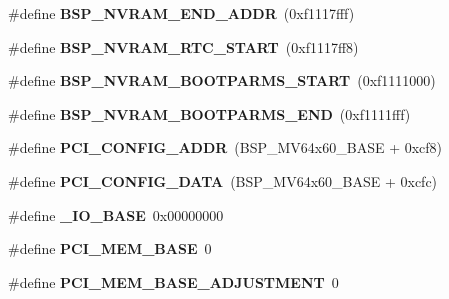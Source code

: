 \begin{DoxyCompactItemize}
\#define {\bfseries B\+S\+P\+\_\+\+N\+V\+R\+A\+M\+\_\+\+E\+N\+D\+\_\+\+A\+D\+DR}~(0xf1117fff)
\item 
\mbox{\label{group__RTEMSBSPsPowerPCBeatnik_ga3a6244f6de5b7d3f8e1a330345f9cb1e}} 
\#define {\bfseries B\+S\+P\+\_\+\+N\+V\+R\+A\+M\+\_\+\+R\+T\+C\+\_\+\+S\+T\+A\+RT}~(0xf1117ff8)
\item 
\mbox{\label{group__RTEMSBSPsPowerPCBeatnik_ga284c3151a3ceaad98c57222132a9d518}} 
\#define {\bfseries B\+S\+P\+\_\+\+N\+V\+R\+A\+M\+\_\+\+B\+O\+O\+T\+P\+A\+R\+M\+S\+\_\+\+S\+T\+A\+RT}~(0xf1111000)
\item 
\mbox{\label{group__RTEMSBSPsPowerPCBeatnik_ga9d6dc9c63b0555fde662d13073737982}} 
\#define {\bfseries B\+S\+P\+\_\+\+N\+V\+R\+A\+M\+\_\+\+B\+O\+O\+T\+P\+A\+R\+M\+S\+\_\+\+E\+ND}~(0xf1111fff)
\item 
\mbox{\label{group__RTEMSBSPsPowerPCBeatnik_ga021c1fbdf175999fc707979d4674f5b9}} 
\#define {\bfseries P\+C\+I\+\_\+\+C\+O\+N\+F\+I\+G\+\_\+\+A\+D\+DR}~(B\+S\+P\+\_\+\+M\+V64x60\+\_\+\+B\+A\+SE + 0xcf8)
\item 
\mbox{\label{group__RTEMSBSPsPowerPCBeatnik_gad1fedcf5fe37518ccc1ddfcb880d1b01}} 
\#define {\bfseries P\+C\+I\+\_\+\+C\+O\+N\+F\+I\+G\+\_\+\+D\+A\+TA}~(B\+S\+P\+\_\+\+M\+V64x60\+\_\+\+B\+A\+SE + 0xcfc)
\item 
\mbox{\label{group__RTEMSBSPsPowerPCBeatnik_gabb10b3234ab8ab0c01ae7bf8e75d9031}} 
\#define {\bfseries \+\_\+\+I\+O\+\_\+\+B\+A\+SE}~0x00000000
\item 
\mbox{\label{group__RTEMSBSPsPowerPCBeatnik_ga4780c0ef836bde00880830140efb1024}} 
\#define {\bfseries P\+C\+I\+\_\+\+M\+E\+M\+\_\+\+B\+A\+SE}~0
\item 
\mbox{\label{group__RTEMSBSPsPowerPCBeatnik_ga9d05e784132095bfc681cf7ab6c1f303}} 
\#define {\bfseries P\+C\+I\+\_\+\+M\+E\+M\+\_\+\+B\+A\+S\+E\+\_\+\+A\+D\+J\+U\+S\+T\+M\+E\+NT}~0
\item 
\mbox{\label{group__RTEMSBSPsPowerPCBeatnik_ga6d9f8ace1e46327132d0a991c6785b40}} 

\end{DoxyCompactItemize}
